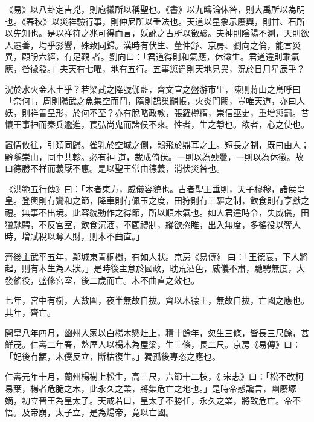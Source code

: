 
\begin{pinyinscope}

 《易》以八卦定吉兇，則庖犧所以稱聖也。《書》以九疇論休咎，則大禹所以為明也。《春秋》以災祥驗行事，則仲尼所以垂法也。天道以星象示廢興，則甘、石所以先知也。是以祥符之兆可得而言，妖訛之占所以徵驗。夫神則陰陽不測，天則欲人遷善，均乎影響，殊致同歸。漢時有伏生、董仲舒、京房、劉向之倫，能言災異，顧盼六經，有足觀
 者。劉向曰：「君道得則和氣應，休徵生。君道違則乖氣應，咎徵發。」夫天有七曜，地有五行。五事愆違則天地見異，況於日月星辰乎？



 況於水火金木土乎？若梁武之降號伽藍，齊文宣之盤游市里，陳則蔣山之鳥呼曰「奈何」，周則陽武之魚集空而鬥，隋則鵲巢黼帳，火炎門闕，豈唯天道，亦曰人妖，則祥眚呈形，於何不至？亦有脫略政教，張羅樽糈，崇信巫史，重增愆罰。昔懷王事神而秦兵逾進，萇弘尚鬼而諸侯不來。性者，生之靜也。欲者，心之使也。



 置情攸往，引類同歸。雀乳於空城之側，鷮飛於鼎耳之上。短長之制，既曰由人；黔隧崇山，同車共軫。必有神
 道，裁成倚伏。一則以為殃釁，一則以為休徵。故曰德勝不祥而義厭不惠。是以聖王常由德義，消伏災咎也。



 《洪範五行傳》曰：「木者東方，威儀容貌也。古者聖王垂則，天子穆穆，諸侯皇皇。登輿則有鸞和之節，降車則有佩玉之度，田狩則有三驅之制，飲食則有享獻之禮。無事不出境。此容貌動作之得節，所以順木氣也。如人君違時令，失威儀，田獵馳騁，不反宮室，飲食沉湎，不顧禮制，縱欲恣睢，出入無度，多徭役以奪人時，增賦稅以奪人財，則木不曲直。」



 齊後主武平五年，鄴城東青桐樹，有如人狀。京房《易傳》
 曰：「王德衰，下人將起，則有木生為人狀。」是時後主怠於國政，耽荒酒色，威儀不肅，馳騁無度，大發徭役，盛修宮室，後二歲而亡。木不曲直之效也。



 七年，宮中有樹，大數圍，夜半無故自拔。齊以木德王，無故自拔，亡國之應也。其年，齊亡。



 開皇八年四月，幽州人家以白楊木懸灶上，積十餘年，忽生三條，皆長三尺餘，甚鮮茂。仁壽二年春，盩厔人以楊木為屋梁，生三條，長二尺。京房《易傳》曰：「妃後有顓，木僕反立，斷枯復生。」獨孤後專恣之應也。



 仁壽元年十月，蘭州楊樹上松生，高三尺，六節十二枝，《
 宋志》曰：「松不改柯易葉，楊者危脆之木，此永久之業，將集危亡之地也。」是時帝惑讒言，幽廢塚嫡，初立晉王為皇太子。天戒若曰，皇太子不勝任，永久之業，將致危亡。帝不悟。及帝崩，太子立，是為煬帝，竟以亡國。




\end{pinyinscope}

